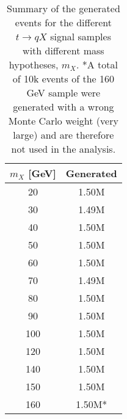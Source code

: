 \begin{table}[htbp]
    \small	
    \begin{tabular}{cc}
    \toprule\toprule
    $m_X$ [GeV] & Generated \\ \midrule
    20  & 1.50M \\
    30  & 1.49M \\
    40  & 1.50M \\
    50  & 1.50M \\
    60  & 1.50M \\
    70  & 1.49M \\
    80  & 1.50M \\
    90  & 1.50M \\
    100 & 1.50M \\
    120 & 1.50M \\
    140 & 1.50M \\
    150 & 1.50M \\
    160 & 1.50M* \\

    \bottomrule\bottomrule  
    \end{tabular}                            
    \caption{Summary of the generated events for the different $t\to qX$ signal samples with different mass hypotheses, $m_X$. *A total of 10k events of the 160 GeV sample were generated
    with a wrong Monte Carlo weight (very large) and are therefore not used in the analysis.}
    \label{tqX:signalsummarytable}
\end{table}

\clearpage




